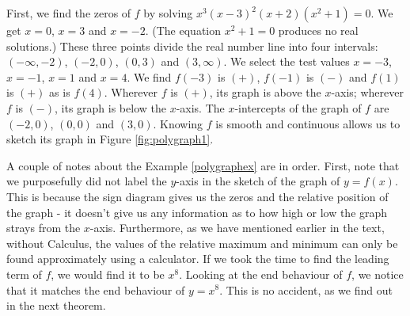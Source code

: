 
\medskip 

{
First, we find the zeros of $f$ by solving $x^3 (x-3)^2 (x+2)\left(x^2+1\right)=0$.   We get $x=0$, $x=3$ and $x=-2$. (The equation $x^2+1=0$ produces no real solutions.)  These three points divide the real number line into four intervals:  $(-\infty, -2)$, $(-2,0)$, $(0,3)$ and $(3,\infty)$.  We select the test values $x=-3$, $x=-1$, $x=1$ and $x=4$. We find $f(-3)$ is $(+)$, $f(-1)$ is $(-)$ and $f(1)$ is $(+)$ as is $f(4)$.  Wherever $f$ is $(+)$, its graph is above the $x$-axis;  wherever $f$ is $(-)$, its graph is below the $x$-axis.  The $x$-intercepts of the graph of $f$ are $(-2,0)$, $(0,0)$ and $(3,0)$.  Knowing $f$ is smooth and continuous allows us to sketch its graph in Figure \ref{fig:polygraph1}.


}

\medskip

A couple of notes about the Example \ref{polygraphex} are in order.  First, note that we purposefully did not label the $y$-axis in the sketch of the graph of $y=f(x)$.  This is because the sign diagram gives us the zeros and the relative position of the graph - it doesn't give us any information as to how high or low the graph strays from the $x$-axis.  Furthermore, as we have mentioned earlier in the text, without Calculus, the values of the relative maximum and minimum can only be found approximately using a calculator.  If we took the time to find the leading term of $f$, we would find it to be $x^8$.  Looking at the end behaviour of $f$, we notice that it matches the end behaviour of $y=x^8$.  This is no accident, as we find out in the next theorem.

